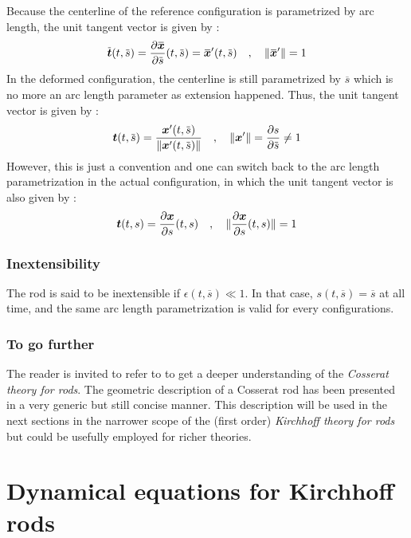 Because the centerline of the reference configuration is parametrized by arc length, the unit tangent vector is given by :
\begin{equation}	
	\overbar{\vect{t}}(t, \overbar{s}) = \frac{\partial \overbar{\vect{x}}}{\partial \overbar{s}} (t, \overbar{s}) = \overbar{\vect{x}}'(t, \overbar{s})
	\quad , \quad
	\norm{\overbar{\vect{x}}'} = 1
\end{equation}
In the deformed configuration, the centerline is still parametrized by $\overbar{s}$ which is no more an arc length parameter as extension happened. Thus, the unit tangent vector is given by :
\begin{equation}	
	\vect{t}(t, \overbar{s}) = \frac{{\vect{x}}'(t, \overbar{s})}{\norm{{\vect{x}}'(t, \overbar{s})}}
	\quad , \quad
	\norm{\vect{x}'} = \frac{\partial s}{\partial \overbar{s}}  \neq 1
\end{equation}
However, this is just a convention and one can switch back to the arc length parametrization in the actual configuration, in which the unit tangent vector is also given by :
\begin{equation}	
	\boldsymbol{t}(t, s) = \frac{\partial \boldsymbol{x}}{\partial s} (t, s)
	\quad , \quad
	\lVert \frac{\partial \boldsymbol{x}}{\partial s} (t, s)\rVert = 1
\end{equation}

\subsubsection{Inextensibility}

The rod is said to be inextensible if $\epsilon(t, \overbar{s}) \ll 1$. In that case, $s(t, \overbar{s}) = \overbar{s}$ at all time, and the same arc length parametrization is valid for every configurations.

\subsubsection{To go further}

The reader is invited to refer to \cite{Antman2005} to get a deeper understanding of the \emph{Cosserat theory for rods}. The geometric description of a Cosserat rod has been presented in a very generic but still concise manner. This description will be used in the next sections in the narrower scope of the (first order) \emph{Kirchhoff theory for rods} but could be usefully employed for richer theories. 

\section{Dynamical equations for Kirchhoff rods}


